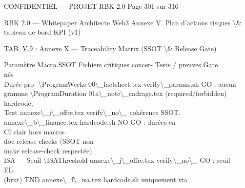 \begin{confidential}CONFIDENTIEL — PROJET RBK 2.0                                                               Page 301 sur 316\end{confidential}
RBK 2.0 — Whitepaper Architecte Web3                                              Annexe V. Plan d’actions risques \textbackslash{}& tableau de bord KPI (v1)\\
\vspace{0.5em}
\vspace{0.5em}
\begin{center}\begin{tabular}TAB. V.9 : Annexe X — Traceability Matrix (SSOT \textbackslash{}& Release Gate)\end{tabular}\end{center}
\vspace{0.5em}
Paramètre     Macro SSOT      Fichiers critiques concer- Tests / preuves        Gate\\
nés\\
Durée pro-    \textbackslash{}ProgramWeeks   00\textbackslash{}_factsheet.tex           verify\textbackslash{}_params.sh   GO : aucun\\
gramme        \textbackslash{}ProgramDuration 01a\textbackslash{}_note\textbackslash{}_cadrage.tex      (required/forbidden)\\
hardcode,\\
Text             annexe\textbackslash{}_j\textbackslash{}_offre.tex        verify\textbackslash{}_no\textbackslash{}_         cohérence SSOT.\\
annexe\textbackslash{}_b\textbackslash{}_finance.tex       hardcode.sh        NO-GO : durées en\\
CI                 clair hors macros\\
doc-release-checks (SSOT non\\
make release-check respectée).\\
ISA — Seuil    \textbackslash{}ISAThreshold   annexe\textbackslash{}_j\textbackslash{}_offre.tex         verify\textbackslash{}_no\textbackslash{}_             GO : seuil\\
\vspace{0.5em}
\vspace{0.5em}
\vspace{0.5em}
\vspace{0.5em}
EL\\
(brut)         TND             annexe\textbackslash{}_f\textbackslash{}_isa.tex           hardcode.sh            uniquement via\\
